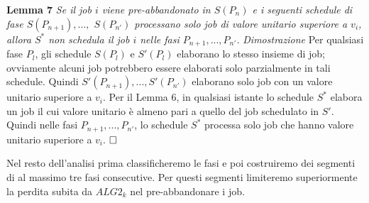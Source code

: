 \documentclass[12pt]{article}
\begin{document}
\textbf{Lemma 7}
\textit{Se il job $i$ viene pre-abbandonato in $S(P_{n})$ e i seguenti schedule di fase $S(P_{n + 1}), . . . ,$ $S(P_{n'})$ processano solo job di valore unitario superiore a $v_{i}$, allora $S^{*}$ non schedula il job $i$ nelle fasi $P_{n + 1}, . . . , P_{n'}$.}
\newline \newline
\textit{Dimostrazione}
Per qualsiasi fase $P_{l}$, gli schedule $S(P_{l})$ e $S'(P_{l})$ elaborano lo stesso insieme di job; ovviamente alcuni job potrebbero essere elaborati solo parzialmente in tali schedule. Quindi $S'(P_{n + 1}), . . . , S'(P_{n'})$ elaborano solo job con un valore unitario superiore a $v_{i}$. Per il Lemma 6, in qualsiasi istante lo schedule $S^*$ elabora un job il cui valore unitario è almeno pari a quello del job schedulato in $S'$. Quindi nelle fasi $P_{n + 1}, . . . , P_{n'}$, lo schedule $S^{*}$ processa solo job che hanno valore unitario superiore a $v_{i}$. $\hfill \square$

Nel resto dell'analisi prima classificheremo le fasi e poi costruiremo dei segmenti di al massimo tre fasi consecutive. Per questi segmenti limiteremo superiormente la perdita subita da $ALG2_{k}$ nel pre-abbandonare i job.
\end{document}
